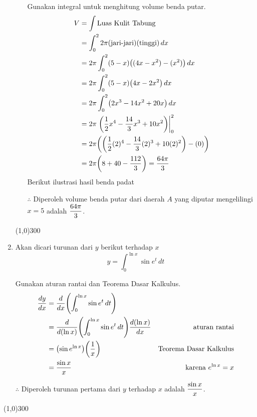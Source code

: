 \begin{enumerate}[leftmargin=*, label={\arabic*}.]
\begin{enumerate}[label={\alph*}.]
    Gunakan integral untuk menghitung volume benda putar.
    \begin{align*}
        V &= \int \text{Luas Kulit Tabung}\\
        &=\int_{0}^{2} 2\pi(\text{jari-jari})(\text{tinggi})\,dx\\
        &=2\pi\int_{0}^{2} (5-x)\brk*{(4x-x^{2})-(x^{2})}\,dx\\
        &=2\pi\int_{0}^{2} (5-x)\brk*{4x-2x^{2}}\,dx\\
        &=2\pi\int_{0}^{2} \brk*{2x^{3}-14x^{2}+20x}\,dx\\
        &=2\pi\eval{\frac{1}{2}x^{4}-\frac{14}{3}x^{3}+10x^{2}}{0}{2}\\
        &=2\pi\brk*{\brk*{\frac{1}{2}(2)^{4}-\frac{14}{3}(2)^{3}+10(2)^{2}}-(0)}\\
        &=2\pi\brk*{8+40-\frac{112}{3}}=\frac{64\pi}{3}
    \end{align*}
    Berikut ilustrasi hasil benda padat

    

    $\therefore$ Diperoleh volume benda putar dari daerah $A$ yang diputar mengelilingi $x=5$ 
    adalah $\displaystyle\frac{64\pi}{3}$.

    \end{enumerate}

\begin{center}\line(1,0){300}\end{center}


\item Akan dicari turunan dari $y$ berikut terhadap $x$
\[
y = \int_{0}^{\ln x}\sin e^{t}\,dt
\]

Gunakan aturan rantai dan Teorema Dasar Kalkulus.
\begin{align*}
    \frac{dy}{dx} &= \drv{x}{\int_{0}^{\ln x}\sin e^{t}\,dt}\\
    &= \drv{(\ln x)}{\int_{0}^{\ln x}\sin e^{t}\,dt}\frac{d(\ln x)}{dx}
    &\text{aturan rantai}\\
    &=\brk*{\sin e^{\ln x}}\brk*{\frac{1}{x}}
    &\text{Teorema Dasar Kalkulus}\\
    &=\frac{\sin x}{x}
    &\text{karena }e^{\ln x} = x
\end{align*}

$\therefore$ Diperoleh turunan pertama dari $y$ terhadap $x$ adalah $\displaystyle\frac{\sin x}{x}$.

\end{enumerate}

\begin{center}\line(1,0){300}\end{center}
